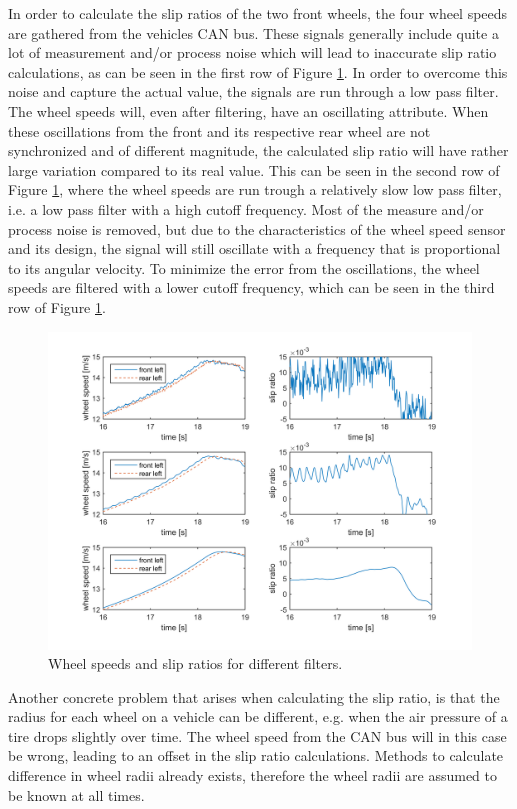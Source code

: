 In order to calculate the slip ratios of the two front wheels, the four wheel speeds are gathered from the vehicles CAN bus. These signals generally include quite a lot of measurement and/or process noise which will lead to inaccurate slip ratio calculations, as can be seen in the first row of Figure \ref{wheel_speed_and_slip}. In order to overcome this noise and capture the actual value, the signals are run through a low pass filter. The wheel speeds will, even after filtering, have an oscillating attribute. When these oscillations from the front and its respective rear wheel are not synchronized and of different magnitude, the calculated slip ratio will have rather large variation compared to its real value. This can be seen in the second row of Figure \ref{wheel_speed_and_slip}, where the wheel speeds are run trough a relatively slow low pass filter, i.e. a low pass filter with a high cutoff frequency. Most of the measure and/or process noise is removed, but due to the characteristics of the wheel speed sensor and its design, the signal will still oscillate with a frequency that is proportional to its angular velocity. To minimize the error from the oscillations, the wheel speeds are filtered with a lower cutoff frequency, which can be seen in the third row of Figure \ref{wheel_speed_and_slip}. 
\begin{figure}[h]
	\centering
	\includegraphics[width=1.0\textwidth]{Pictures/wheel_speed_and_slip}
	\caption {Wheel speeds and slip ratios for different filters.}
	\label{wheel_speed_and_slip}
\end{figure}
Another concrete problem that arises when calculating the slip ratio, is that the radius for each wheel on a vehicle can be different, e.g. when the air pressure of a tire drops slightly over time. The wheel speed from the CAN bus will in this case be wrong, leading to an offset in the slip ratio calculations. Methods to calculate difference in wheel radii already exists, therefore the wheel radii are assumed to be known at all times.

